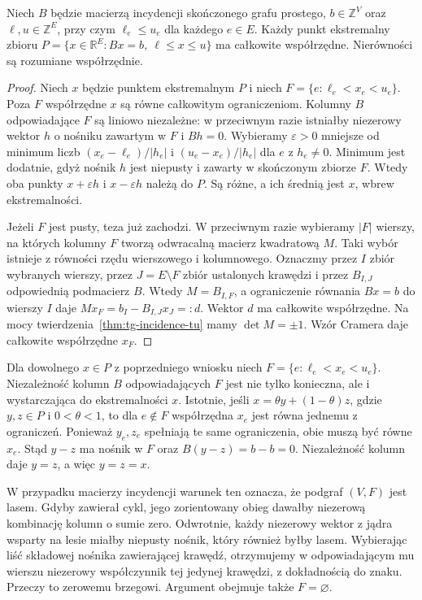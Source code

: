 \begin{wniosek}
\label{cor:tg-integral-flow-vertices}
Niech $B$ będzie macierzą incydencji skończonego grafu prostego,
$b\in\mathbb Z^V$ oraz $\ell,u\in\mathbb Z^E$,
przy czym $\ell_e\le u_e$ dla każdego $e\in E$.
Każdy punkt ekstremalny zbioru
$P=\{x\in\mathbb R^E:Bx=b,\ \ell\le x\le u\}$
ma całkowite współrzędne. Nierówności są rozumiane współrzędnie.
\end{wniosek}
\begin{proof}
Niech $x$ będzie punktem ekstremalnym $P$ i niech
$F=\{e:\ell_e<x_e<u_e\}$. Poza $F$ współrzędne $x$ są
równe całkowitym ograniczeniom. Kolumny $B$ odpowiadające
$F$ są liniowo niezależne: w przeciwnym razie istniałby
niezerowy wektor $h$ o nośniku zawartym w $F$ i $Bh=0$.
Wybieramy $\varepsilon>0$ mniejsze od minimum liczb
$(x_e-\ell_e)/|h_e|$ i $(u_e-x_e)/|h_e|$ dla $e$ z $h_e\ne0$.
Minimum jest dodatnie, gdyż nośnik $h$ jest niepusty
i zawarty w skończonym zbiorze $F$. Wtedy oba punkty
$x+\varepsilon h$ i $x-\varepsilon h$ należą do $P$.
Są różne, a ich średnią jest $x$, wbrew ekstremalności.

Jeżeli $F$ jest pusty, teza już zachodzi. W przeciwnym razie
wybieramy $|F|$ wierszy, na których kolumny $F$ tworzą
odwracalną macierz kwadratową $M$. Taki wybór istnieje
z równości rzędu wierszowego i kolumnowego.
Oznaczmy przez $I$ zbiór wybranych wierszy, przez $J=E\setminus F$
zbiór ustalonych krawędzi i przez $B_{I,J}$ odpowiednią
podmacierz $B$. Wtedy $M=B_{I,F}$, a ograniczenie równania
$Bx=b$ do wierszy $I$ daje $Mx_F=b_I-B_{I,J}x_J=:d$.
Wektor $d$ ma całkowite współrzędne.
Na mocy twierdzenia~\ref{thm:tg-incidence-tu} mamy
$\det M=\pm1$. Wzór Cramera daje całkowite współrzędne $x_F$.
\end{proof}

\begin{uwaga}
Dla dowolnego $x\in P$ z poprzedniego wniosku
niech $F=\{e:\ell_e<x_e<u_e\}$. Niezależność
kolumn $B$ odpowiadających $F$ jest nie tylko
konieczna, ale i wystarczająca do ekstremalności
$x$. Istotnie, jeśli $x=\theta y+(1-\theta)z$,
gdzie $y,z\in P$ i $0<\theta<1$, to dla
$e\notin F$ współrzędna $x_e$ jest równa
jednemu z ograniczeń. Ponieważ $y_e,z_e$
spełniają te same ograniczenia, obie muszą
być równe $x_e$. Stąd $y-z$ ma nośnik
w $F$ oraz $B(y-z)=b-b=0$. Niezależność
kolumn daje $y=z$, a więc $y=z=x$.

W przypadku macierzy incydencji warunek ten
oznacza, że podgraf $(V,F)$ jest lasem.
Gdyby zawierał cykl, jego zorientowany obieg
dawałby niezerową kombinację kolumn o sumie zero.
Odwrotnie, każdy niezerowy wektor z jądra
wsparty na lesie miałby niepusty nośnik,
który również byłby lasem. Wybierając liść
składowej nośnika zawierającej krawędź,
otrzymujemy w odpowiadającym mu wierszu
niezerowy współczynnik tej jedynej krawędzi,
z dokładnością do znaku. Przeczy to zerowemu
brzegowi. Argument obejmuje także $F=\varnothing$.
\end{uwaga}

